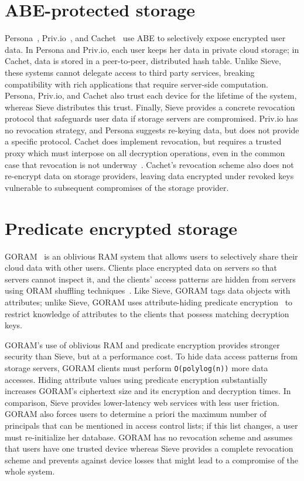 \section{ABE-protected storage} 
Persona~\cite{persona},
Priv.io~\cite{privio}, and Cachet~\cite{cachet}
use ABE to selectively expose encrypted user data.
In Persona and Priv.io, each user keeps her data
in private cloud storage; in Cachet, data is
stored in a peer-to-peer, distributed hash table.
Unlike Sieve, these systems cannot delegate access
to third party services, breaking compatibility
with rich applications that require server-side
computation.
Persona, Priv.io, and Cachet also trust each device
for the  lifetime of the system, whereas Sieve
distributes this trust. Finally, Sieve provides a
concrete revocation protocol that safeguards user
data if storage servers are compromised. Priv.io
has no revocation strategy, and Persona suggests
re-keying data, but does not provide a specific
protocol. Cachet does implement revocation, but
requires a trusted proxy which must interpose on
all decryption operations, even in the common case
that revocation is not underway~\cite{easier}.
Cachet's revocation scheme also does not re-encrypt
data on storage providers, leaving data encrypted
under revoked keys vulnerable to subsequent
compromises of the storage provider.

\section{Predicate encrypted storage}
GORAM~\cite{GORAM} is an oblivious RAM system
that allows users to selectively share their
cloud data with other users. Clients place
encrypted data on servers so that servers cannot
inspect it, and the clients' access patterns are
hidden from servers using ORAM shuffling
techniques~\cite{shroud}. Like Sieve, GORAM tags
data objects with attributes; unlike Sieve,
GORAM uses attribute-hiding predicate encryption~\cite{katz2008,shen2009}
to restrict knowledge of attributes to the
clients that possess matching decryption keys.

GORAM's use of oblivious RAM and predicate
encryption provides stronger security than Sieve,
but at a performance cost. To hide
data access patterns from storage servers, GORAM
clients must perform \texttt{O(polylog(n))} more
data accesses. Hiding attribute values using
predicate encryption substantially increases 
GORAM's ciphertext size and its encryption
and decryption times. In comparison, Sieve
provides lower-latency web services with less
user friction. GORAM also forces users to
determine a priori the maximum number of
principals that can be mentioned in access
control lists; if this list changes, a user must
re-initialize her database. GORAM has no revocation
scheme and assumes that users have one trusted
device whereas Sieve provides a complete revocation
scheme and prevents against device losses
that might lead to a compromise of the whole
system.

